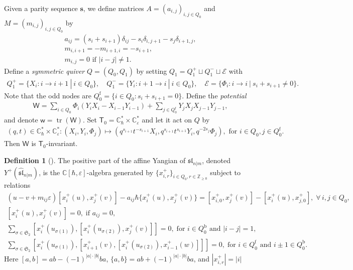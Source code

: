 \documentclass[10pt]{amsart}
\theoremstyle{definition}
\newtheorem{Definition}[Theorem]{Definition}
\numberwithin{equation}{section}
\newcommand{\bC}{\mathbb{C}}
\newcommand{\bZ}{\mathbb{Z}}
\newcommand{\sT}{\mathsf{T}}
\newcommand{\sW}{\mathsf{W}}
\newcommand{\sw}{\mathsf{w}}
\newcommand{\tr}{\operatorname{tr}}
\begin{document}
Given a parity sequence $\mathbf s$, we define matrices $A=(a_{i,j})_{i,j\in Q_0}$ and $M=(m_{i,j})_{i,j\in Q_0}$ by
\begin{equation}\label{aij and mij}
\begin{gathered}
a_{ij}=(s_i+s_{i+1})\delta_{ij}-s_i\delta_{i,j+1}-s_{j}\delta_{i+1,j},\\
m_{i,i+1}=-m_{i+1,i}=-s_{i+1},\\
m_{i,j}=0\text{ if }|i-j|\neq 1.
\end{gathered}
\end{equation}
Define a \textit{symmetric quiver} $Q=(Q_0,Q_1)$ by setting $Q_1=Q_1^+\sqcup Q_1^-\sqcup \mathcal E$ with
\begin{align*}
Q_1^+=\{X_i:i\to i+1\:|\:i\in Q_0\},\quad Q_1^-=\{Y_i:i+1\to i\:|\:i\in Q_0\},\quad \mathcal E=\{\Phi_i:i\to i\:|\:s_i+s_{i+1}\neq 0\}.
\end{align*}
Note that the odd nodes are $Q_0^{\mathrm{f}}=\{i\in Q_0:s_i+s_{i+1}=0\}$. Define the \textit{potential}
\begin{align*}
\sW=\sum_{i\in Q_0}\Phi_i(Y_iX_i-X_{i-1}Y_{i-1})+\sum_{j\in Q_0^{\mathrm{f}}}Y_jX_jX_{j-1}Y_{j-1},
\end{align*}
and denote $\sw=\tr(\sW)$. Set $\sT_0=\bC^*_\hbar\times \bC^*_{\varepsilon}$ and let it act on $Q$ by 
\begin{align*}
(q,t)\in \bC^*_\hbar\times \bC^*_{\varepsilon}:(X_i,Y_i,\Phi_j)\mapsto (q^{s_{i+1}}t^{-s_{i+1}}X_i,q^{s_{i+1}}t^{s_{i+1}}Y_i,q^{-2s_j}\Phi_j),\text{ for }i\in Q_0,j\in Q_0^{\mathrm{f}}.
\end{align*}
Then $\sW$ is $\sT_0$-invariant.

\begin{Definition}[{\cite{U,VV1}}]
The positive part of the affine Yangian of $\mathfrak{sl}_{n|m}$, denoted $Y^+(\widehat{\mathfrak{sl}}_{n|m})$, is the $\bC[\hbar,\varepsilon]$-algebra generated by $\{x^+_{i,r}\}_{i\in Q_0,r\in \bZ_{\geqslant0}}$ subject to relations
\begin{equation}\label{relation for Y^+(aff sl(n|m))}
\begin{gathered}
(u-v+m_{ij}\varepsilon)[x^+_i(u),x^+_j(v)]-a_{ij}\hbar\{x^+_i(u),x^+_j(v)\}=[x^+_{i,0},x^+_j(v)]-[x^+_i(u),x^+_{j,0}],\;\forall \, i,j\in Q_0,\\
[x^+_i(u),x^+_j(v)]=0,\;\text{if }a_{ij}=0,\\
\sum_{\sigma\in \mathfrak{S}_2} [x^+_i(u_{\sigma(1)}),[x^+_i(u_{\sigma(2)}),x^+_j(v)]]=0,\; \text{for } i\in Q_0^{\mathrm{b}}\text{ and }|i-j|=1,\\
\sum_{\sigma\in \mathfrak{S}_2} [x^+_i(u_{\sigma(1)}),[x^+_{i+1}(v),[x^+_i(u_{\sigma(2)}),x^+_{i-1}(w)]]]=0,\; \text{for } i\in Q_0^{\mathrm{f}}\text{ and }i\pm 1\in Q_0^{\mathrm{b}}.
\end{gathered}
\end{equation}
Here $[a,b]=ab-(-1)^{|a|\cdot|b|}ba$, $\{a,b\}=ab+(-1)^{|a|\cdot|b|}ba$, and $|x^+_{i,r}|=|i|$
\end{Definition}
\end{document}
